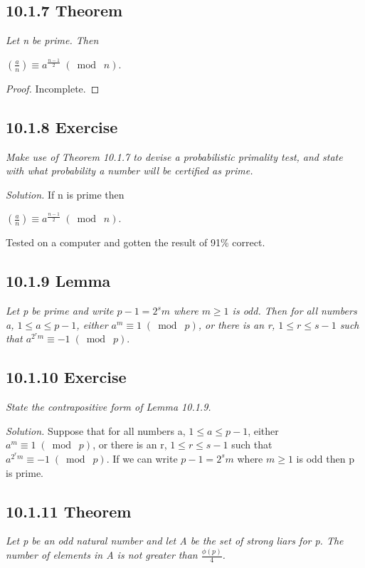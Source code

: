 \documentclass{article}
\begin{document}
\subsection*{10.1.7 Theorem} 
\quad \textit{Let n be prime. Then}
\begin{center}
    $(\frac{a}{n}) \equiv a^{\frac{n-1}{2}} \;(\bmod\; n)$.
\end{center}

\begin{proof}
Incomplete.
\end{proof}

\subsection*{10.1.8 Exercise} 
\quad \textit{Make use of Theorem 10.1.7 to devise a probabilistic primality test, and state with what probability a number will be certified as prime.}

\textit{Solution.} If n is prime then 
\begin{center}
    $(\frac{a}{n}) \equiv a^{\frac{n-1}{2}} \;(\bmod\; n)$.
\end{center}
Tested on a computer and gotten the result of 91\% correct.

\subsection*{10.1.9 Lemma} 
\quad \textit{Let p be prime and write $p-1 = 2^sm$ where $m \geq 1$ is odd. Then for all numbers a, $1 \leq a \leq p-1$, either $a^m \equiv 1 \;(\bmod\; p)$, or there is an r, $1 \leq r \leq s-1$ such that $a^{2^rm} \equiv -1 \;(\bmod\; p).$}

\subsection*{10.1.10 Exercise} 
\quad \textit{State the contrapositive form of Lemma 10.1.9.}

\textit{Solution.} Suppose that for all numbers a, $1 \leq a \leq p-1$, either $a^m \equiv 1 \;(\bmod\; p)$, or there is an r, $1 \leq r \leq s-1$ such that $a^{2^rm} \equiv -1 \;(\bmod\; p).$ If we can write  $p-1 = 2^sm$ where $m \geq 1$ is odd then p is prime.

\subsection*{10.1.11 Theorem} 
\quad \textit{Let p be an odd natural number and let A be the set of strong liars for p. The number of elements in A is not greater than $\frac{\phi(p)}{4}$.}
\end{document}
